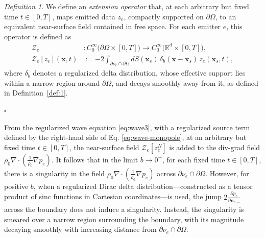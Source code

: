\documentclass[11pt,reqno]{amsart}
\theoremstyle{remark}
\newtheorem{definition}{Definition}
\theoremstyle{italic_lemma}
\newcommand{\bx}{\boldsymbol{x}}
\newcommand{\bn}{\boldsymbol{n}}
\begin{document}
\begin{definition} \label{def:z}
We define an \emph{extension operator} that, at each arbitrary but fixed time \( t \in [0, T] \), maps emitted data \( z_e \), compactly supported on \( \partial \Omega \), to an equivalent near-surface field contained in free space. For each emitter \( e \), this operator is defined as
\begin{align}  \label{eq:z}
        \mathcal{Z}_e & : C_0^{\infty} \big( \partial \Omega \times [0, T] \big) \rightarrow C_0^\infty \big( \mathbb{R}^d \times [0, T] \big), \\
        \mathcal{Z}_e [ z_e ] (\bx, t) & := 
            -2 \displaystyle\int_{\partial \nu_e \cap \partial \Omega} dS(\bx_s)\, \delta_b(\bx - \bx_s)\, z_e(\bx_s, t), 
\end{align}
where \( \delta_b \) denotes a regularized delta distribution, whose effective support lies within a narrow region around \( \partial \Omega \), and decays smoothly away from it, as defined in Definition~\ref{def:1}.
\end{definition}
\hfill\(\square\)


From the regularized wave equation \eqref{eq:wave3}, with a regularized source term defined by the right-hand side of Eq. \eqref{eq:wave-monopole}, at an arbitrary but fixed time \(t \in [0,T]\), the near-surface field \(\mathcal{Z}_e[z_e^N]\) is added to the div-grad field \(\rho_0 \nabla \cdot \left( \frac{1}{\rho_0} \nabla p_e \right)\). 
It follows that in the limit \(b \rightarrow 0^+\), for each fixed time \(t \in [0,T]\), there is a singularity in the field 
\(\rho_0 \nabla \cdot \left( \frac{1}{\rho_0} \nabla p_e \right)\) across \(\partial \nu_e \cap \partial \Omega\). However, for positive \(b\), when a regularized Dirac delta distribution—constructed 
as a tensor product of sinc functions in Cartesian coordinates—is used, the jump \(2 \frac{\partial p_e}{\partial \bn_{e,-}}\) across the boundary does not induce a singularity. Instead, the singularity is smeared over a narrow region surrounding the boundary, with its magnitude decaying smoothly with increasing distance from 
\(\partial \nu_e \cap \partial \Omega\).
\end{document}
